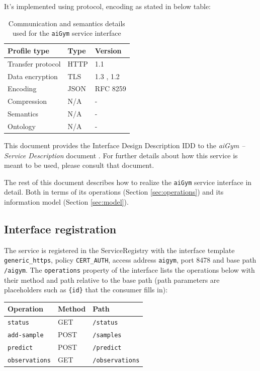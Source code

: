 \documentclass[a4paper]{arrowhead}
\begin{document}
It's implemented using protocol, encoding as stated in below table:
\begin{table}[ht!]
  \centering
  \begin{tabular}{|l|l|l|}
    \hline
    \rowcolor{gray!33} Profile type & Type & Version \\ \hline
    Transfer protocol & HTTP & 1.1 \cite{rfc9112} \\ \hline
    Data encryption & TLS & 1.3 \cite{rfc8446}, 1.2 \cite{rfc5246} \\ \hline
    Encoding & JSON & RFC 8259 \cite{rfc8259} \\ \hline
    Compression & N/A & - \\ \hline
    Semantics & N/A & - \\ \hline
    Ontology & N/A & - \\ \hline
  \end{tabular}
  \caption{Communication and semantics details used for the \texttt{aiGym} service interface}
  \label{tab:comunication_semantics_profile}
\end{table}

This document provides the Interface Design Description IDD to the \textit{aiGym -- Service Description} document \cite{aig-aiGym-sd}.
For further details about how this service is meant to be used, please consult that document.

The rest of this document describes how to realize the \texttt{aiGym} service
interface in detail. Both in terms of its operations (Section \ref{sec:operations}) and its information model (Section \ref{sec:model}).

\subsection{Interface registration}

The service is registered in the ServiceRegistry with the interface template \texttt{generic\_\allowbreak{}https}, policy \texttt{CERT\_\allowbreak{}AUTH}, access address \texttt{aigym}, port 8478 and base path \texttt{/\allowbreak{}aigym}. The \texttt{operations} property of the interface lists the operations below with their method and path relative to the base path (path parameters are placeholders such as \texttt{\{id\}} that the consumer fills in):

\noindent\begin{longtable}{| p{5.2cm} | p{1.6cm} | p{8.4cm} |} \hline
\rowcolor{gray!33} Operation & Method & Path \\ \hline \endhead
\texttt{status} & GET & \texttt{/\allowbreak{}status} \\ \hline
\texttt{add-\allowbreak{}sample} & POST & \texttt{/\allowbreak{}samples} \\ \hline
\texttt{predict} & POST & \texttt{/\allowbreak{}predict} \\ \hline
\texttt{observations} & GET & \texttt{/\allowbreak{}observations} \\ \hline
\end{longtable}
\end{document}
